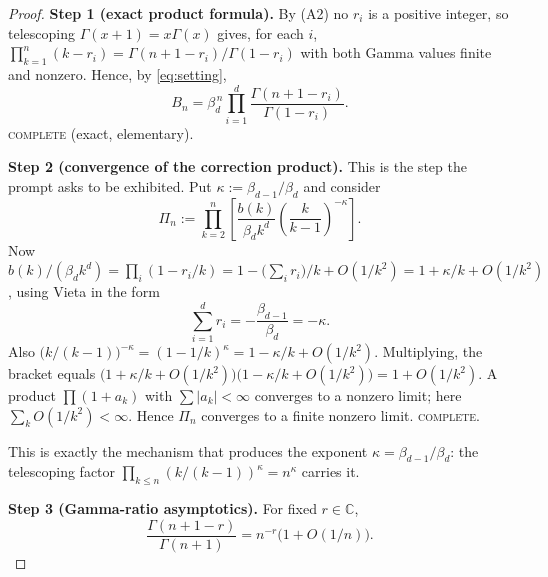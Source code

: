 \documentclass[11pt]{article}
\theoremstyle{definition}
\newcommand{\bd}{\beta_d}
\newcommand{\bdm}{\beta_{d-1}}
\newcommand{\C}{\mathbb{C}}
\begin{document}
\begin{proof}
\textbf{Step 1 (exact product formula).} By (A2) no $r_i$ is a positive
integer, so telescoping $\Gamma(x+1)=x\Gamma(x)$ gives, for each $i$,
$\prod_{k=1}^{n}(k-r_i)=\Gamma(n+1-r_i)/\Gamma(1-r_i)$ with both Gamma values
finite and nonzero. Hence, by \eqref{eq:setting},
\begin{equation}\label{eq:Bnexact}
B_n=\bd^{\,n}\prod_{i=1}^{d}\frac{\Gamma(n+1-r_i)}{\Gamma(1-r_i)} .
\end{equation}
\textsc{complete} (exact, elementary).

\medskip\noindent\textbf{Step 2 (convergence of the correction product).}
This is the step the prompt asks to be exhibited. Put $\kappa:=\bdm/\bd$ and
consider
\[
\Pi_n:=\prod_{k=2}^{n}\left[\frac{b(k)}{\bd k^{d}}\left(\frac{k}{k-1}\right)^{-\kappa}\right].
\]
Now $b(k)/(\bd k^d)=\prod_i(1-r_i/k)=1-\bigl(\sum_i r_i\bigr)/k+O(1/k^2)
=1+\kappa/k+O(1/k^2)$, using Vieta in the form
\begin{equation}\label{eq:vieta}
\sum_{i=1}^{d}r_i=-\frac{\bdm}{\bd}=-\kappa .
\end{equation}
Also $\bigl(k/(k-1)\bigr)^{-\kappa}=(1-1/k)^{\kappa}=1-\kappa/k+O(1/k^2)$.
Multiplying, the bracket equals
$\bigl(1+\kappa/k+O(1/k^2)\bigr)\bigl(1-\kappa/k+O(1/k^2)\bigr)=1+O(1/k^2)$.
A product $\prod(1+a_k)$ with $\sum|a_k|<\infty$ converges to a nonzero limit;
here $\sum_k O(1/k^2)<\infty$. Hence $\Pi_n$ converges to a finite nonzero
limit. \textsc{complete.}

This is exactly the mechanism that produces the exponent $\kappa=\bdm/\bd$:
the telescoping factor $\prod_{k\le n}(k/(k-1))^{\kappa}=n^{\kappa}$ carries it.

\medskip\noindent\textbf{Step 3 (Gamma-ratio asymptotics).}
For fixed $r\in\C$,
\begin{equation}\label{eq:gammaratio}
\frac{\Gamma(n+1-r)}{\Gamma(n+1)}=n^{-r}\bigl(1+O(1/n)\bigr).
\end{equation}


\end{proof}
\end{document}
